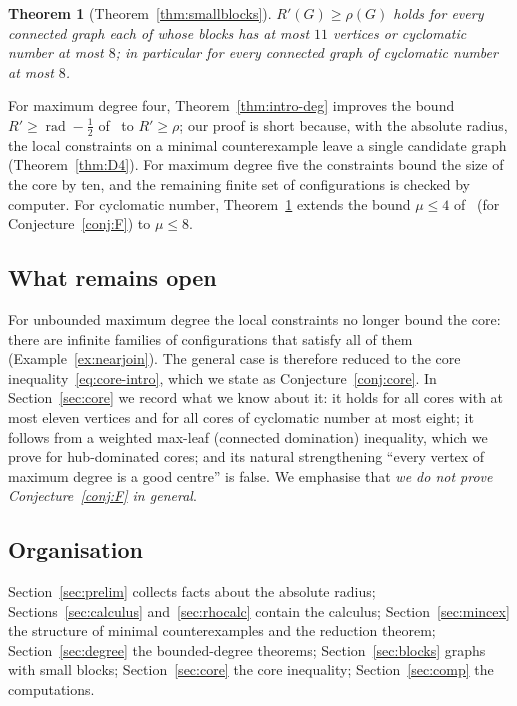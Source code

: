 \documentclass[11pt]{amsart}
\newtheorem{theorem}{Theorem}[section]
\theoremstyle{definition}
\newcommand{\rad}{\operatorname{rad}}
\newcommand{\Rp}{R'}
\begin{document}
\begin{theorem}[Theorem~\ref{thm:smallblocks}]\label{thm:intro-blocks}
$\Rp(G)\ge\rho(G)$ holds for every connected graph each of whose blocks has at most $11$ vertices or cyclomatic number
at most $8$; in particular for every connected graph of cyclomatic number at most $8$.
\end{theorem}

For maximum degree four, Theorem~\ref{thm:intro-deg} improves the bound $\Rp\ge\rad-\frac12$ of~\cite{CPS} to
$\Rp\ge\rho$; our proof is short because, with the absolute radius, the local constraints on a minimal
counterexample leave a single candidate graph (Theorem~\ref{thm:D4}). For maximum degree five the constraints bound
the size of the core by ten, and the remaining finite set of configurations is checked by computer. For cyclomatic
number, Theorem~\ref{thm:intro-blocks} extends the bound $\mu\le4$ of~\cite{DTZ} (for Conjecture~\ref{conj:F}) to
$\mu\le8$.

\subsection{What remains open}
For unbounded maximum degree the local constraints no longer bound the core: there are infinite families of
configurations that satisfy all of them (Example~\ref{ex:nearjoin}). The general case is therefore reduced to the
core inequality~\eqref{eq:core-intro}, which we state as Conjecture~\ref{conj:core}. In Section~\ref{sec:core} we
record what we know about it: it holds for all cores with at most eleven vertices and for all cores of cyclomatic
number at most eight; it follows from a weighted max-leaf (connected domination) inequality, which we prove for
hub-dominated cores; and its natural strengthening ``every vertex of maximum degree is a good centre'' is false.
We emphasise that \emph{we do not prove Conjecture~\ref{conj:F} in general}.

\subsection{Organisation}
Section~\ref{sec:prelim} collects facts about the absolute radius; Sections~\ref{sec:calculus}
and~\ref{sec:rhocalc} contain the calculus; Section~\ref{sec:mincex} the structure of minimal counterexamples and
the reduction theorem; Section~\ref{sec:degree} the bounded-degree theorems; Section~\ref{sec:blocks} graphs with
small blocks; Section~\ref{sec:core} the core inequality; Section~\ref{sec:comp} the computations.
\end{document}
